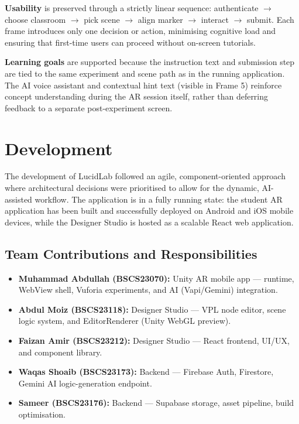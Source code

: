 \documentclass[12pt,a4paper]{article}
\begin{document}
\textbf{Usability} is preserved through a strictly linear sequence: authenticate
$\to$ choose classroom $\to$ pick scene $\to$ align marker $\to$ interact $\to$ submit.
Each frame introduces only one decision or action, minimising cognitive load and ensuring
that first-time users can proceed without on-screen tutorials.

\textbf{Learning goals} are supported because the instruction text and submission step
are tied to the same experiment and scene path as in the running application. The AI
voice assistant and contextual hint text (visible in Frame 5) reinforce concept
understanding during the AR session itself, rather than deferring feedback to a separate
post-experiment screen.

\section{Development}

The development of LucidLab followed an agile, component-oriented approach where
architectural decisions were prioritised to allow for the dynamic, AI-assisted workflow.
The application is in a fully running state: the student AR application has been built
and successfully deployed on Android and iOS mobile devices, while the Designer Studio
is hosted as a scalable React web application.

\subsection{Team Contributions and Responsibilities}

\begin{itemize}[leftmargin=1.4cm]
  \item \textbf{Muhammad Abdullah (BSCS23070):} Unity AR mobile app --- runtime,
        WebView shell, Vuforia experiments, and AI (Vapi/Gemini) integration.
  \item \textbf{Abdul Moiz (BSCS23118):} Designer Studio --- VPL node editor, scene
        logic system, and EditorRenderer (Unity WebGL preview).
  \item \textbf{Faizan Amir (BSCS23212):} Designer Studio --- React frontend, UI/UX,
        and component library.
  \item \textbf{Waqas Shoaib (BSCS23173):} Backend --- Firebase Auth, Firestore,
        Gemini AI logic-generation endpoint.
  \item \textbf{Sameer (BSCS23176):} Backend --- Supabase storage, asset pipeline,
        build optimisation.
\end{itemize}
\end{document}
